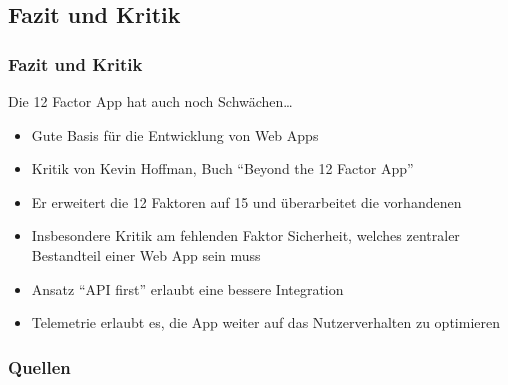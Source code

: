 \documentclass{beamer}
\begin{document}
			\subsection{Fazit und Kritik}
			\begin{frame}
				\frametitle{Fazit und Kritik}
				
				\begin{block}{Die 12 Factor App hat auch noch Schwächen\ldots}
					\begin{itemize}
					\item Gute Basis für die Entwicklung von Web Apps
					\item Kritik von Kevin Hoffman, Buch \enquote{Beyond the 12 Factor App}~\cite{beyond}
					\item Er erweitert die 12 Faktoren auf 15 und überarbeitet die vorhandenen
					\item Insbesondere Kritik am fehlenden Faktor Sicherheit, welches zentraler Bestandteil einer Web App sein muss
					\item Ansatz \enquote{API first} erlaubt eine bessere Integration
					\item Telemetrie erlaubt es, die App weiter auf das Nutzerverhalten zu optimieren
				\end{itemize}
				\end{block}
				
			
			\end{frame}
	\begin{frame}
		\frametitle{Quellen}
		\renewcommand{\bibfont}{\scriptsize}
		\printbibliography[heading=none]
	\end{frame}
\end{document}
